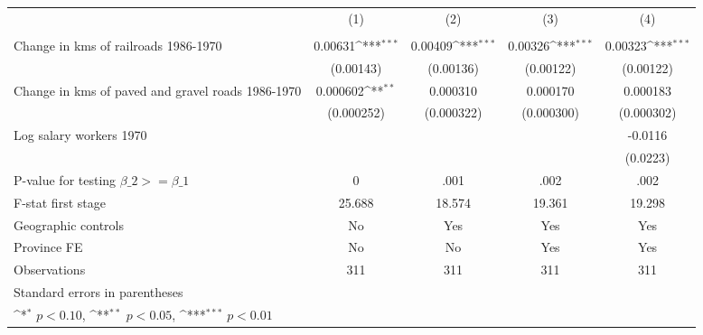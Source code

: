 {
\def\sym#1{\ifmmode^{#1}\else\(^{#1}\)\fi}
\begin{tabular}{l*{4}{c}}
\hline\hline
                &\multicolumn{1}{c}{(1)}&\multicolumn{1}{c}{(2)}&\multicolumn{1}{c}{(3)}&\multicolumn{1}{c}{(4)}\\
                &\multicolumn{1}{c}{}&\multicolumn{1}{c}{}&\multicolumn{1}{c}{}&\multicolumn{1}{c}{}\\
\hline
Change in kms of railroads 1986-1970&  0.00631\sym{***}&  0.00409\sym{***}&  0.00326\sym{***}&  0.00323\sym{***}\\
                &(0.00143)         &(0.00136)         &(0.00122)         &(0.00122)         \\
[1em]
Change in kms of paved and gravel roads 1986-1970& 0.000602\sym{**} & 0.000310         & 0.000170         & 0.000183         \\
                &(0.000252)         &(0.000322)         &(0.000300)         &(0.000302)         \\
[1em]
Log salary workers 1970&                  &                  &                  &  -0.0116         \\
                &                  &                  &                  & (0.0223)         \\
\hline
P-value for testing $\beta\_{2} >= \beta\_{1}$&        0         &     .001         &     .002         &     .002         \\
F-stat first stage&   25.688         &   18.574         &   19.361         &   19.298         \\
Geographic controls&       No         &      Yes         &      Yes         &      Yes         \\
Province FE     &       No         &       No         &      Yes         &      Yes         \\
Observations    &      311         &      311         &      311         &      311         \\
\hline\hline
\multicolumn{5}{l}{\footnotesize Standard errors in parentheses}\\
\multicolumn{5}{l}{\footnotesize \sym{*} \(p<0.10\), \sym{**} \(p<0.05\), \sym{***} \(p<0.01\)}\\
\end{tabular}
}
